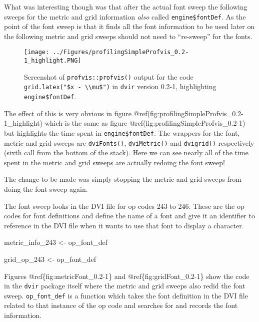\documentclass[]{article}
\newenvironment{Shaded}{\begin{snugshade}}{\end{snugshade}}
\newcommand{\DecValTok}[1]{\textcolor[rgb]{0.00,0.00,0.81}{#1}}
\newcommand{\StringTok}[1]{\textcolor[rgb]{0.31,0.60,0.02}{#1}}
\newcommand{\NormalTok}[1]{#1}
\begin{document}
What was interesting though was that after the actual font sweep the
following sweeps for the metric and grid information \emph{also} called
\texttt{engine\$fontDef}. As the point of the font sweep is that it
finds all the font information to be used later on the following metric
and grid sweeps should not need to ``re-sweep'' for the fonts.

\begin{figure}
\centering
\texttt{[image: ../Figures/profilingSimpleProfvis\_0.2-1\_highlight.PNG]}
\caption{Screenshot of \texttt{profvis::profvis()} output for the code
\texttt{grid.latex("\$x\ -\ \textbackslash{}\textbackslash{}mu\$")} in
\texttt{dvir} version 0.2-1, highlighting \texttt{engine\$fontDef}.}
\end{figure}

The effect of this is very obvious in figure
@ref(fig:profilingSimpleProfvis\_0.2-1\_highlight) which is the same as
figure @ref(fig:profilingSimpleProfvis\_0.2-1) but highlights the time
spent in \texttt{engine\$fontDef}. The wrappers for the font, metric and
grid sweeps are \texttt{dviFonts()}, \texttt{dviMetric()} and
\texttt{dvigrid()} respectively (sixth call from the bottom of the
stack). Here we can see nearly all of the time spent in the metric and
grid sweeps are actually redoing the font sweep!

The change to be made was simply stopping the metric and grid sweeps
from doing the font sweep again.

The font sweep looks in the DVI file for op codes 243 to 246. These are
the op codes for font definitions and define the name of a font and give
it an identifier to reference in the DVI file when it wants to use that
font to display a character.

\begin{Shaded}
\begin{Highlighting}[]
\NormalTok{metric_info_}\DecValTok{243}\NormalTok{ <-}\StringTok{ }\NormalTok{op_font_def}
\end{Highlighting}
\end{Shaded}

\begin{Shaded}
\begin{Highlighting}[]
\NormalTok{grid_op_}\DecValTok{243}\NormalTok{ <-}\StringTok{ }\NormalTok{op_font_def}
\end{Highlighting}
\end{Shaded}

Figures @ref\{fig:metricFont\_0.2-1\} and @ref\{fig:gridFont\_0.2-1\}
show the code in the \texttt{dvir} package itself where the metric and
grid sweeps also redid the font sweep. \texttt{op\_font\_def} is a
function which takes the font definition in the DVI file related to that
instance of the op code and searches for and records the font
information.
\end{document}
